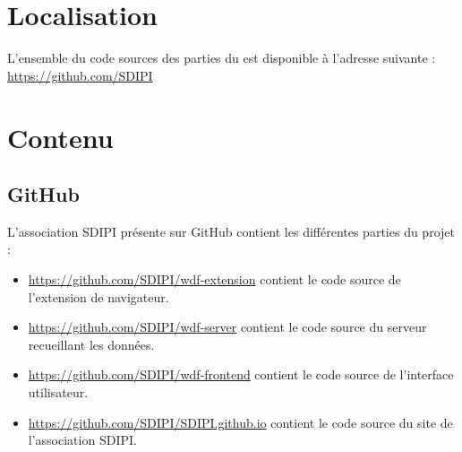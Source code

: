 \section{Localisation}

	L’ensemble du code sources des parties du est disponible à l’adresse suivante :
	\url{https://github.com/SDIPI}

\section{Contenu}

	\subsection{GitHub}

	L'association SDIPI présente sur GitHub contient les différentes parties du projet :
	\begin{itemize}
		\item \url{https://github.com/SDIPI/wdf-extension} contient le code source de l'extension de navigateur.
		\item \url{https://github.com/SDIPI/wdf-server} contient le code source du serveur recueillant les données.
		\item \url{https://github.com/SDIPI/wdf-frontend} contient le code source de l'interface utilisateur.
		\item \url{https://github.com/SDIPI/SDIPI.github.io} contient le code source du site de l'association SDIPI.
	\end{itemize}
